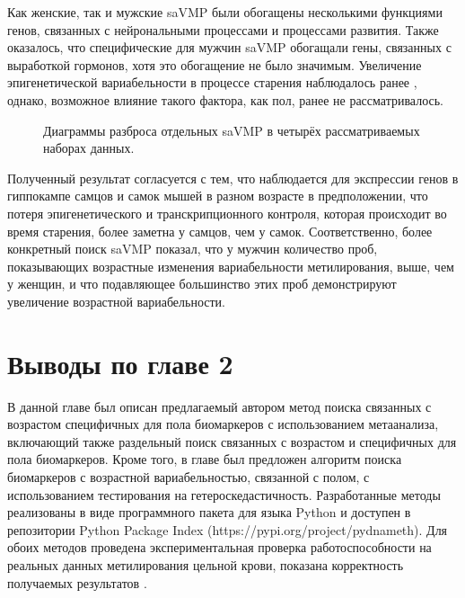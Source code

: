 Как женские, так и мужские saVMP были обогащены несколькими функциями генов, связанных с нейрональными процессами и процессами развития. Также оказалось, что специфические для мужчин saVMP обогащали гены, связанных с выработкой гормонов, хотя это обогащение не было значимым. Увеличение эпигенетической вариабельности в процессе старения наблюдалось ранее \autocite{Slieker2016}, однако, возможное влияние такого фактора, как пол, ранее не рассматривалось. 

\begin{figure}[ht]
	\caption[Диаграммы разброса отдельных saVMP в четырёх рассматриваемых наборах данных.]{Диаграммы разброса отдельных saVMP в четырёх рассматриваемых наборах данных.}\label{fig:saVMP}
\end{figure}

Полученный результат согласуется с тем, что наблюдается для экспрессии генов в гиппокампе самцов и самок мышей в разном возрасте \autocite{Mangold2017} в предположении, что потеря эпигенетического и транскрипционного контроля, которая происходит во время старения, более заметна у самцов, чем у самок. Соответственно, более конкретный поиск saVMP показал, что у мужчин количество проб, показывающих возрастные изменения вариабельности метилирования, выше, чем у женщин, и что подавляющее большинство этих проб демонстрируют увеличение возрастной вариабельности.

\section*{Выводы по главе 2} \label{sec:ch2/conclusion}                       

В данной главе был описан предлагаемый автором метод поиска связанных с возрастом специфичных для пола биомаркеров с использованием метаанализа, включающий также раздельный поиск связанных с возрастом и специфичных для пола биомаркеров. Кроме того, в главе был предложен алгоритм поиска биомаркеров с возрастной вариабельностью, связанной с полом, с использованием тестирования на гетероскедастичность. Разработанные методы реализованы в виде программного пакета для языка Python и доступен в репозитории Python Package Index (https://pypi.org/project/pydnameth). Для обоих методов проведена экспериментальная проверка работоспособности на реальных данных метилирования цельной крови, показана корректность получаемых результатов \autocite{Yusipov2020}.

\FloatBarrier
